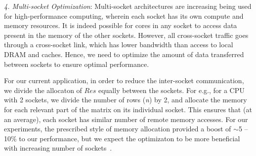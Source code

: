      

     \vspace*{0.1in}
     {\it{4. Multi-socket Optimization}}: 
     Multi-socket architectures are increasing being used for
     high-performance computing, wherein each socket has its own
     compute and memory resources. It is indeed possible for cores in
     any socket to access data present in the memory of the other
     sockets. However, all cross-socket traffic goes through a
     cross-socket link, which has lower bandwidth than access to local
     DRAM and caches. Hence, we need to optimize the amount of data
     transferred between sockets to ensure optimal performance.

     For our current application, in order to reduce the inter-socket
     communication, we divide the allocaton of $Res$ equally between
     the sockets. For e.g., for a CPU with 2 sockets, we divide the
     number of rows ({\it{n}}) by 2, and allocate the memory for each
     relevant part of the matrix on its individual socket. This
     ensures that (at an average), each socket has similar number of
     remote memory accesses. For our experiments, the
     prescribed style of memory allocation provided a boost of
     $\sim$5 -- 10\% to our performance, but we expect the optimizaton
     to be more beneficial with increasing number of
     sockets~\cite{fdsfds}.
     
     







